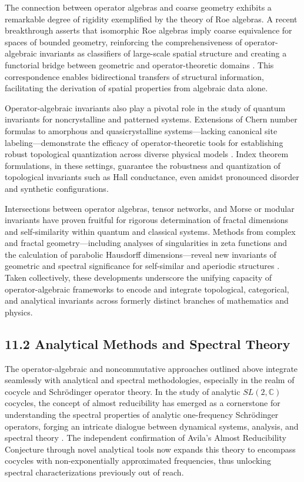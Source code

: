 \documentclass[11pt]{article}
\begin{document}
The connection between operator algebras and coarse geometry exhibits a remarkable degree of rigidity exemplified by the theory of Roe algebras. A recent breakthrough asserts that isomorphic Roe algebras imply coarse equivalence for spaces of bounded geometry, reinforcing the comprehensiveness of operator-algebraic invariants as classifiers of large-scale spatial structure and creating a functorial bridge between geometric and operator-theoretic domains \cite{ref34}. This correspondence enables bidirectional transfers of structural information, facilitating the derivation of spatial properties from algebraic data alone.

Operator-algebraic invariants also play a pivotal role in the study of quantum invariants for noncrystalline and patterned systems. Extensions of Chern number formulas to amorphous and quasicrystalline systems—lacking canonical site labeling—demonstrate the efficacy of operator-theoretic tools for establishing robust topological quantization across diverse physical models \cite{ref25}. Index theorem formulations, in these settings, guarantee the robustness and quantization of topological invariants such as Hall conductance, even amidst pronounced disorder and synthetic configurations.

Intersections between operator algebras, tensor networks, and Morse or modular invariants have proven fruitful for rigorous determination of fractal dimensions and self-similarity within quantum and classical systems. Methods from complex and fractal geometry—including analyses of singularities in zeta functions and the calculation of parabolic Hausdorff dimensions—reveal new invariants of geometric and spectral significance for self-similar and aperiodic structures \cite{ref2,ref19,ref14}. Taken collectively, these developments underscore the unifying capacity of operator-algebraic frameworks to encode and integrate topological, categorical, and analytical invariants across formerly distinct branches of mathematics and physics.

\subsection{11.2 Analytical Methods and Spectral Theory}

The operator-algebraic and noncommutative approaches outlined above integrate seamlessly with analytical and spectral methodologies, especially in the realm of cocycle and Schrödinger operator theory. In the study of analytic $SL(2,\mathbb{C})$ cocycles, the concept of almost reducibility has emerged as a cornerstone for understanding the spectral properties of analytic one-frequency Schrödinger operators, forging an intricate dialogue between dynamical systems, analysis, and spectral theory \cite{ref91}. The independent confirmation of Avila's Almost Reducibility Conjecture through novel analytical tools now expands this theory to encompass cocycles with non-exponentially approximated frequencies, thus unlocking spectral characterizations previously out of reach.
\end{document}
